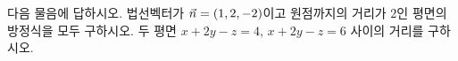 다음 물음에 답하시오.
 법선벡터가 $\vec{n}=(1{,}\mkern3mu\mathopen{}2{,}\mkern3mu\mathopen{}-2)$이고 원점까지의 거리가 $2$인 평면의 방정식을 모두 구하시오.
 두 평면 $x+2y-z=4$, $x+2y-z=6$ 사이의 거리를 구하시오.
